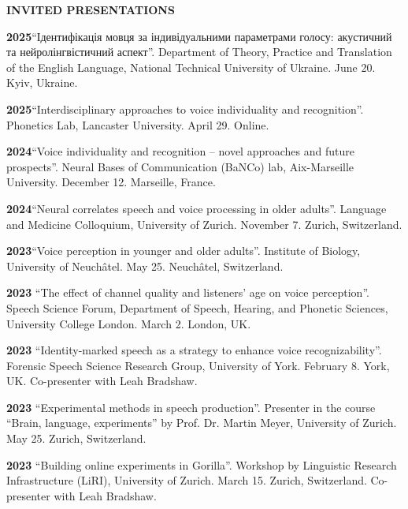 \documentclass[11pt]{article}
\newcommand{\hangpara}{
 \setlength{\parindent}{0in} %
 \hangindent=0.42in %
}
\begin{document}
\vskip 20pt
\begin{flushleft}
{\bf INVITED PRESENTATIONS}
\end{flushleft}

\hangpara
{\bf 2025}\hspace{1ex}“Ідентифікація мовця за індивідуальними параметрами голосу: акустичний та нейролінгвістичний аспект”. Department of Theory, Practice and Translation of the English Language, National Technical University of Ukraine. June 20. Kyiv, Ukraine. 

\vskip 6pt
\hangpara
{\bf 2025}\hspace{1ex}“Interdisciplinary approaches to voice individuality and recognition”. Phonetics Lab, Lancaster University. April 29. Online. 

\vskip 6pt
\hangpara
{\bf 2024}\hspace{1ex}“Voice individuality and recognition – novel approaches and future prospects”. Neural Bases of Communication (BaNCo) lab, Aix-Marseille University. December 12. Marseille, France. 

\vskip 6pt
\hangpara
{\bf 2024}\hspace{1ex}“Neural correlates speech and voice processing in older adults”. Language and Medicine Colloquium, University of Zurich. November 7. Zurich, Switzerland. 

\vskip 6pt
\hangpara
{\bf 2023}\hspace{1ex}“Voice perception in younger and older adults”. Institute of Biology, University of Neuchâtel. May 25. Neuchâtel, Switzerland. 

\vskip 6pt
\hangpara
{\bf 2023}\hspace{1ex} “The effect of channel quality and listeners’ age on voice perception”. Speech Science Forum, Department of Speech, Hearing, and Phonetic Sciences, University College London. March 2. London, UK.

\vskip 6pt
\hangpara
{\bf 2023}\hspace{1ex} “Identity-marked speech as a strategy to enhance voice recognizability”. Forensic Speech Science Research Group, University of York. February 8. York, UK. Co-presenter with Leah Bradshaw.

\vskip 6pt
\hangpara
{\bf 2023}\hspace{1ex} “Experimental methods in speech production”. Presenter in the course “Brain, language, experiments” by Prof. Dr. Martin Meyer, University of Zurich. May 25. Zurich, Switzerland. 

\vskip 6pt
\hangpara
{\bf 2023}\hspace{1ex} “Building online experiments in Gorilla”. Workshop by Linguistic Research Infrastructure (LiRI), University of Zurich. March 15. Zurich, Switzerland. Co-presenter with Leah Bradshaw.
\end{document}
